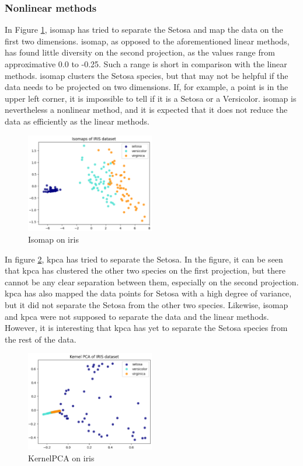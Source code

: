 \subsubsection{Nonlinear methods}\label{subsubsec:nonlinear-methods-on-iris}
In Figure \ref{fig:iris-isomap}, \gls{isomap} has tried to separate the Setosa and map the data on the first two dimensions. \gls{isomap}, as opposed to the aforementioned linear methods, has found little diversity on the second projection, as the values range from approximative 0.0 to -0.25. Such a range is short in comparison with the linear methods. \gls{isomap} clusters the Setosa species, but that may not be helpful if the data needs to be projected on two dimensions. If, for example, a point is in the upper left corner, it is impossible to tell if it is a Setosa or a Versicolor. \gls{isomap} is nevertheless a nonlinear method, and it is expected that it does not reduce the data as efficiently as the linear methods.

\begin{figure}[htb!]
    \centering
    \includegraphics[width=0.5\textwidth]{figures/theory-example-figures/iris-isomap.png}
    \caption{Isomap on iris}
    \label{fig:iris-isomap}
\end{figure}

In figure \ref{fig:iris-kernelpca}, \gls{kpca} has tried to separate the Setosa. In the figure, it can be seen that \gls{kpca} has clustered the other two species on the first projection, but there cannot be any clear separation between them, especially on the second projection. \gls{kpca} has also mapped the data points for Setosa with a high degree of variance, but it did not separate the Setosa from the other two species. Likewise, \gls{isomap} and \gls{kpca} were not supposed to separate the data and the linear methods. However, it is interesting that \gls{kpca} has yet to separate the Setosa species from the rest of the data.

\begin{figure}[htb!]
    \centering
    \includegraphics[width=0.5\textwidth]{figures/theory-example-figures/iris-kernelpca.png}
    \caption{KernelPCA on iris}
    \label{fig:iris-kernelpca}
\end{figure}

